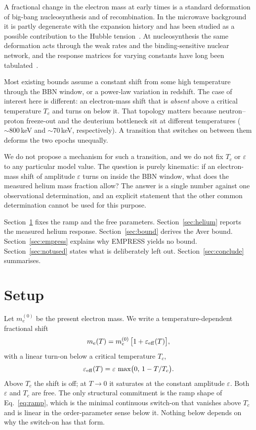 \documentclass[aps,prd,twocolumn,superscriptaddress,nofootinbib,10pt]{revtex4-2}
\begin{document}
A fractional change in the electron mass at early times is a standard deformation of big-bang
nucleosynthesis and of recombination. In the microwave background it is partly degenerate with
the expansion history and has been studied as a possible contribution to the Hubble
tension~\cite{HartChluba2018,HartChluba2020,SekiguchiTakahashi2021}. At nucleosynthesis the same
deformation acts through the weak rates and the binding-sensitive nuclear network, and the
response matrices for varying constants have long been tabulated~\cite{DentSternWetterich2007}.

Most existing bounds assume a constant shift from some high temperature through the BBN window,
or a power-law variation in redshift. The case of interest here is different: an electron-mass
shift that is \emph{absent} above a critical temperature $T_c$ and turns on below it. That
topology matters because neutron--proton freeze-out and the deuterium bottleneck sit at different
temperatures ($\sim\!800\,$keV and $\sim\!70\,$keV, respectively). A transition that switches on
between them deforms the two epochs unequally.

We do not propose a mechanism for such a transition, and we do not fix $T_c$ or $\varepsilon$ to
any particular model value. The question is purely kinematic: if an electron-mass shift of
amplitude $\varepsilon$ turns on inside the BBN window, what does the measured helium mass fraction
allow? The answer is a single number against one observational determination, and an explicit
statement that the other common determination cannot be used for this purpose.

Section~\ref{sec:setup} fixes the ramp and the free parameters. Section~\ref{sec:helium} reports
the measured helium response. Section~\ref{sec:bound} derives the Aver bound.
Section~\ref{sec:empress} explains why EMPRESS yields no bound.
Section~\ref{sec:notused} states what is deliberately left out. Section~\ref{sec:conclude}
summarises.

\section{Setup}\label{sec:setup}

Let $m_e^{(0)}$ be the present electron mass. We write a temperature-dependent fractional shift
%
\begin{equation}
  m_e(T) = m_e^{(0)}\,\bigl[1 + \varepsilon_{\rm eff}(T)\bigr],
  \label{eq:me}
\end{equation}
%
with a linear turn-on below a critical temperature $T_c$,
%
\begin{equation}
  \varepsilon_{\rm eff}(T)
  = \varepsilon \,\max\bigl(0,\, 1 - T/T_c\bigr).
  \label{eq:ramp}
\end{equation}
%
Above $T_c$ the shift is off; at $T\to 0$ it saturates at the constant amplitude $\varepsilon$.
Both $\varepsilon$ and $T_c$ are free. The only structural commitment is the ramp shape of
Eq.~\eqref{eq:ramp}, which is the minimal continuous switch-on that vanishes above $T_c$ and is
linear in the order-parameter sense below it. Nothing below depends on why the switch-on has that
form.
\end{document}

